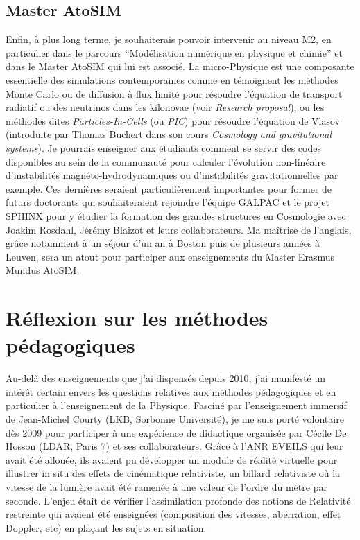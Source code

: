 \documentclass[11pt,onecolumn]{article}
\begin{document}
\subsection{Master AtoSIM}

Enfin, à plus long terme, je souhaiterais pouvoir intervenir au niveau M2, en particulier dans le parcours “Modélisation numérique en physique et chimie” et dans le Master AtoSIM qui lui est associé. La micro-Physique est une composante essentielle des simulations contemporaines comme en témoignent les méthodes Monte Carlo ou de diffusion à flux limité pour résoudre l’équation de transport radiatif ou des neutrinos dans les kilonovae (voir \textit{Research proposal}), ou les méthodes dites \textit{Particles-In-Cells} (ou \textit{PIC}) pour résoudre l’équation de Vlasov (introduite par Thomas Buchert dans son cours \textit{Cosmology and gravitational systems}). Je pourrais enseigner aux étudiants comment se servir des codes disponibles au sein de la communauté pour calculer l’évolution non-linéaire d’instabilités magnéto-hydrodynamiques ou d’instabilités gravitationnelles par exemple. Ces dernières seraient particulièrement importantes pour former de futurs doctorants qui souhaiteraient rejoindre l’équipe GALPAC et le projet SPHINX pour y étudier la formation des grandes structures en Cosmologie avec Joakim Rosdahl, Jérémy Blaizot et leurs collaborateurs. Ma maîtrise de l'anglais, grâce notamment à un séjour d'un an à Boston puis de plusieurs années à Leuven, sera un atout pour participer aux enseignements du Master Erasmus Mundus AtoSIM.

\section{Réflexion sur les méthodes pédagogiques}

Au-delà des enseignements que j'ai dispensés depuis 2010, j'ai manifesté un intérêt certain envers les questions relatives aux méthodes pédagogiques et en particulier à l'enseignement de la Physique. Fasciné par l'enseignement immersif de Jean-Michel Courty (LKB, Sorbonne Université), je me suis porté volontaire dès 2009 pour participer à une expérience de didactique organisée par Cécile De Hosson (LDAR, Paris 7) et ses collaborateurs. Grâce à l'ANR EVEILS qui leur avait été allouée, ils avaient pu développer un module de réalité virtuelle pour illustrer in situ des effets de cinématique relativiste, un billard relativiste où la vitesse de la lumière avait été ramenée à une valeur de l'ordre du mètre par seconde. L'enjeu était de vérifier l'assimilation profonde des notions de Relativité restreinte qui avaient été enseignées (composition des vitesses, aberration, effet Doppler, etc) en plaçant les sujets en situation.
\end{document}

